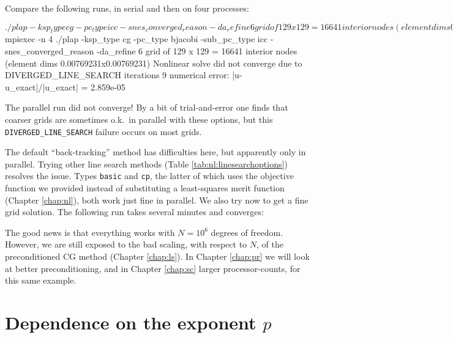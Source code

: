 Compare the following runs, in serial and then on four processes:
\begin{cline}
$ ./plap -ksp_type cg -pc_type icc -snes_converged_reason -da_refine 6
grid of 129 x 129 = 16641 interior nodes (element dims 0.00769231x0.00769231)
Nonlinear solve converged due to CONVERGED_FNORM_RELATIVE iterations 11
numerical error:  |u-u_exact|/|u_exact| = 4.490e-06
$ mpiexec -n 4 ./plap -ksp_type cg -pc_type bjacobi -sub_pc_type icc -snes_converged_reason -da_refine 6
grid of 129 x 129 = 16641 interior nodes (element dims 0.00769231x0.00769231)
Nonlinear solve did not converge due to DIVERGED_LINE_SEARCH iterations 9
numerical error:  |u-u_exact|/|u_exact| = 2.859e-05
\end{cline}
The parallel run did not converge!  By a bit of trial-and-error one finds that coarser grids are sometimes o.k.~in parallel with these options, but this \texttt{DIVERGED\_LINE\_SEARCH} failure occurs on most grids.

The default ``back-tracking'' method has difficulties here, but apparently only in parallel.  Trying other line search methods (Table \ref{tab:nl:linesearchoptions}) resolves the issue.  Types \texttt{basic} and \texttt{cp}, the latter of which uses the objective function we provided instead of substituting a least-squares merit function (Chapter \ref{chap:nl}), both work just fine in parallel.  We also try now to get a fine grid solution.  The following run takes several minutes and converges:
The good news is that everything works with $N=10^6$ degrees of freedom.  However, we are still exposed to the bad scaling, with respect to $N$, of the preconditioned CG method (Chapter \ref{chap:ls}).  In Chapter \ref{chap:pr} we will look at better preconditioning, and in Chapter \ref{chap:sc} larger processor-counts, for this same example.


\section{Dependence on the exponent $p$}

